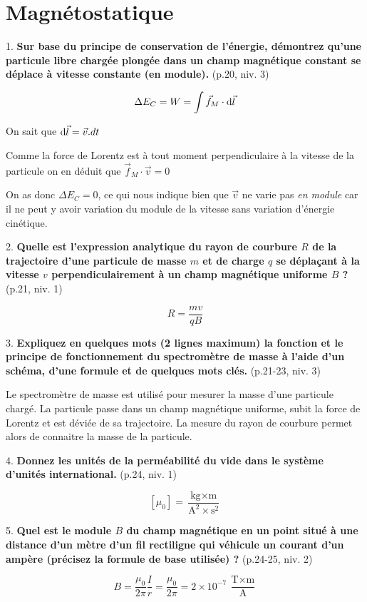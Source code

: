 \documentclass	[11pt, a4paper, openany]{book}
\begin{document}
		
\newpage
\renewcommand{\quest}[4]{#1. \textbf{#4} (p.#2, niv. #3)}
\section{Magnétostatique}

\quest{1}{20}{3}{Sur base du principe de conservation de l’énergie, démontrez qu’une particule libre chargée plongée dans un champ magnétique constant se déplace à vitesse constante (en module).}

$$\Delta E_C = W = \int \vec f_M \cdot {\rm d}\vec l$$

On sait que ${\rm d}\vec l = \vec v . dt$

Comme la force de Lorentz est à tout moment perpendiculaire à la vitesse de la particule on en déduit que $\vec f_M \cdot \vec v = 0$

On as donc $\Delta E_C = 0$, ce qui nous indique bien que $\vec v$ ne varie pas \emph{en module} car il ne peut y avoir variation du module de la vitesse sans variation d'énergie cinétique.

\quest{2}{21}{1}{Quelle est l’expression analytique du rayon de courbure $R$ de la trajectoire d’une particule de masse $m$ et de charge $q$ se déplaçant à la vitesse $v$ perpendiculairement à un champ magnétique uniforme $B$ ?}

$$ R = \dfrac{mv}{qB}$$

\quest{3}{21-23}{3}{Expliquez en quelques mots (2 lignes maximum) la fonction et le principe de fonctionnement du spectromètre de masse à l’aide d’un schéma, d’une formule et de quelques mots clés.}

Le spectromètre de masse est utilisé pour mesurer la masse d'une particule chargé. La particule passe dans un champ magnétique uniforme, subit la force de Lorentz et est déviée de sa trajectoire. La mesure du rayon de courbure permet alors de connaitre la masse de la particule.

\quest{4}{24}{1}{Donnez les unités de la perméabilité du vide dans le système d’unités international.}

$$ [\mu_0] = \dfrac{\text{kg}\times \text{m}}{\text{A}^2\times \text{s}^2}  $$

\quest{5}{24-25}{2}{Quel est le module $B$ du champ magnétique en un point situé à une distance d’un mètre d’un fil rectiligne qui véhicule un courant d’un ampère (précisez la formule de base utilisée) ?}

$$ B = \dfrac{\mu_0}{2\pi} \dfrac{I}{r} = \dfrac{\mu_0}{2\pi} = 2\times 10^{-7}\ \frac{\text{T}\times \text{m}}{\text{A}}$$
\end{document}
